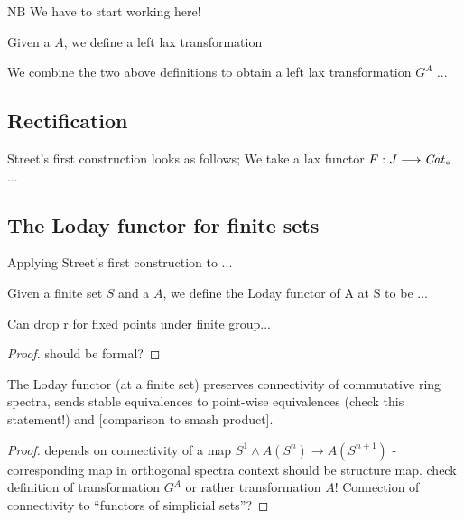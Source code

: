     NB We have to start working here!

    \begin{defn}\label{def_left_lax_transformation_A}
      Given a \hring $A$, we define a left lax transformation
    \end{defn}

    \begin{defn}\label{def_left_lax_transform_G^A}
      We combine the two above definitions to obtain a left lax transformation $G^A$ ...
    \end{defn}

  \subsection{Rectification}

    \begin{defn}\label{def_streets_first_construction}
      Street's first construction looks as follows; We take a lax functor $F: J \longrightarrow \mathit{Cat}_*$ ...
    \end{defn}

  \subsection{The Loday functor for finite sets}
    \begin{defn}\label{def_rectification_of_G^A}
      Applying Street's first construction to ...
    \end{defn}

    \begin{defn}\label{def_loday_functor_finite_sets}
      Given a finite set $S$ and a \hring $A$, we define the Loday functor of A at S to be ...
    \end{defn}

    \begin{lem}\label{lem_loday_functor_fixed_points}
      Can drop r for fixed points under finite group...
      \begin{proof}
        should be formal?
      \end{proof}
    \end{lem}

    \begin{lem}\label{lem_loday_functor_preserves_connectivity}
      The Loday functor (at a finite set) preserves connectivity of commutative ring spectra, sends stable equivalences to point-wise equivalences (check this statement!) and [comparison to smash product].
      \begin{proof}
        depends on connectivity of a map $S^1 \wedge A(S^n) \to A(S^{n+1})$ - corresponding map in orthogonal spectra context should be structure map. check definition of transformation $G^A$ or rather transformation $A$! Connection of connectivity to ``functors of simplicial sets''?
      \end{proof}
    \end{lem}

